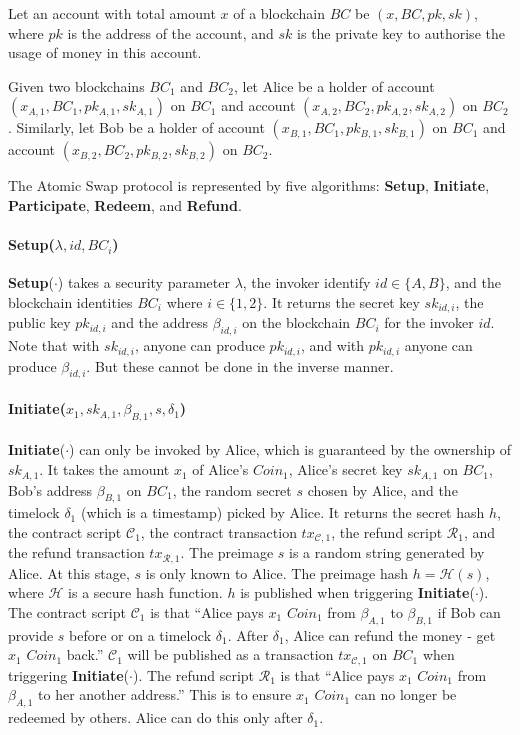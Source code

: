 Let an account with total amount $x$ of a blockchain $BC$ be
$(x,BC,pk,sk)$, where $pk$ is the address of the account, and $sk$ is
the private key to authorise the usage of money in this account.

Given two blockchains $BC_1$ and $BC_2$, let Alice be a holder of
account $(x_{A,1},BC_1,pk_{A,1},sk_{A,1})$ on $BC_1$ and account
$(x_{A,2},BC_2,pk_{A,2},sk_{A,2})$ on $BC_2$. Similarly, let Bob be a
holder of account $(x_{B,1},BC_1,pk_{B,1},sk_{B,1})$ on $BC_1$ and
account $(x_{B,2},BC_2,pk_{B,2},sk_{B,2})$ on $BC_2$.

The Atomic Swap protocol is represented by five algorithms:
\textbf{Setup},
\textbf{Initiate},
\textbf{Participate},
\textbf{Redeem}, and
\textbf{Refund}.


\paragraph{\textbf{Setup}($\lambda, id, BC_i$)}
\textbf{Setup}($\cdot$) takes a security parameter $\lambda$,
the invoker identify $id \in \{A, B\}$,
and the blockchain identities $BC_i$ where $i \in \{1, 2\}$.
It returns the secret key $sk_{id, i}$, the public key $pk_{id, i}$ and the address $\beta_{id, i}$ on the blockchain $BC_i$ for the invoker $id$.
Note that with $sk_{id, i}$, anyone can produce $pk_{id, i}$, and with $pk_{id, i}$ anyone can produce $\beta_{id, i}$. But these cannot be done in the inverse manner.

\paragraph{\textbf{Initiate}($x_1, sk_{A, 1}, \beta_{B, 1}, s, \delta_1$)}
\textbf{Initiate}($\cdot$) can only be invoked by Alice, which is guaranteed by the ownership of $sk_{A, 1}$.
It takes the amount $x_1$ of Alice's $Coin_1$,
Alice's secret key $sk_{A, 1}$ on $BC_1$,
Bob's address $\beta_{B, 1}$ on $BC_1$,
the random secret $s$ chosen by Alice,
and the timelock $\delta_1$ (which is a timestamp) picked by Alice.
It returns the secret hash $h$,
the contract script $\mathcal{C}_1$,
the contract transaction $tx_{\mathcal{C}, 1}$,
the refund script $\mathcal{R}_1$,
and the refund transaction $tx_{\mathcal{R}, 1}$.
The preimage $s$ is a random string generated by Alice. At this stage, $s$ is only known to Alice.
The preimage hash $h = \mathcal{H}(s)$, where $\mathcal{H}$ is a secure hash function.
$h$ is published when triggering \textbf{Initiate}($\cdot$).
The contract script $\mathcal{C}_1$ is that ``Alice pays $x_1$ $Coin_1$ from $\beta_{A, 1}$ to $\beta_{B, 1}$ if Bob can provide $s$ before or on a timelock $\delta_1$. After $\delta_1$, Alice can refund the money - get $x_1$ $Coin_1$ back.''
$\mathcal{C}_1$ will be published as a transaction $tx_{\mathcal{C}, 1}$ on $BC_1$ when triggering \textbf{Initiate}($\cdot$).
The refund script $\mathcal{R}_1$ is that ``Alice pays $x_1$ $Coin_1$ from $\beta_{A, 1}$ to her another address.'' This is to ensure $x_1$ $Coin_1$ can no longer be redeemed by others. Alice can do this only after $\delta_1$.

